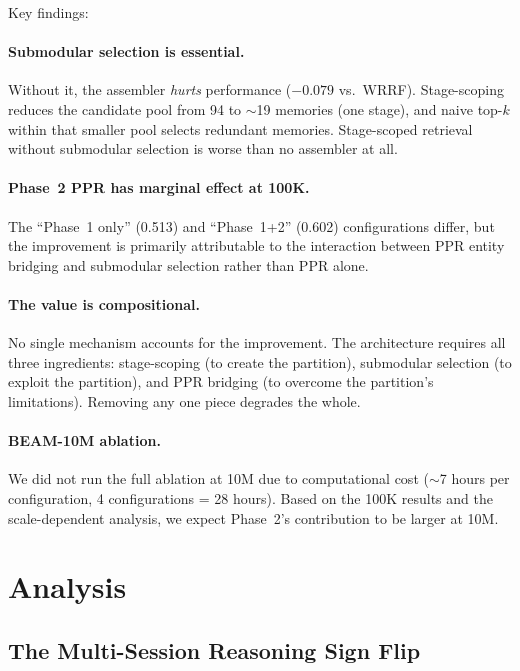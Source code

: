 \documentclass[11pt]{article}
\begin{document}
Key findings:

\paragraph{Submodular selection is essential.}
Without it, the assembler \emph{hurts} performance ($-0.079$ vs.\
WRRF).  Stage-scoping reduces the candidate pool from 94 to $\sim$19
memories (one stage), and naive top-$k$ within that smaller pool
selects redundant memories.  Stage-scoped retrieval without submodular
selection is worse than no assembler at all.

\paragraph{Phase~2 PPR has marginal effect at 100K.}
The ``Phase~1 only'' (0.513) and ``Phase~1+2'' (0.602) configurations
differ, but the improvement is primarily attributable to the
interaction between PPR entity bridging and submodular selection
rather than PPR alone.

\paragraph{The value is compositional.}
No single mechanism accounts for the improvement.  The architecture
requires all three ingredients: stage-scoping (to create the
partition), submodular selection (to exploit the partition), and PPR
bridging (to overcome the partition's limitations).  Removing any one
piece degrades the whole.

\paragraph{BEAM-10M ablation.}
We did not run the full ablation at 10M due to computational cost
($\sim$7 hours per configuration, 4 configurations = 28 hours).
Based on the 100K results and the scale-dependent analysis, we expect
Phase~2's contribution to be larger at 10M.

\section{Analysis}
\label{sec:analysis}

\subsection{The Multi-Session Reasoning Sign Flip}
\label{sec:sign-flip}
\end{document}
